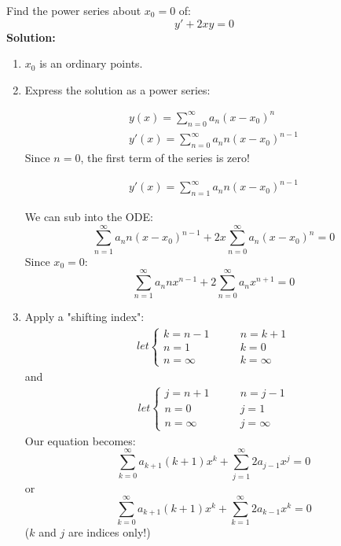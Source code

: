 \begin{exmp}{}
Find the power series about $x_0=0$ of:
\begin{equation*}
y'+2xy=0
\end{equation*}
\textbf{Solution:}\\
\begin{enumerate}
\item $x_0$ is an ordinary points.
\item Express the solution as a power series:

\begin{align*}
y(x) = \sum^\infty_{n=0} a_n\left(x-x_0\right)^n\\
y'(x) = \sum^\infty_{n=0} a_n n\left(x-x_0\right)^{n-1}
\end{align*}
Since $n=0$, the first term of the series is zero!

\begin{align*}
y'(x) = \sum^\infty_{n=1} a_n n\left(x-x_0\right)^{n-1}
\end{align*}

We can sub into the ODE:
\begin{equation*}
\sum^\infty_{n=1} a_n n\left(x-x_0\right)^{n-1}+2x\sum^\infty_{n=0} a_n\left(x-x_0\right)^n=0
\end{equation*}
Since $x_0=0$:
\begin{equation*}
\sum^\infty_{n=1} a_n nx^{n-1}+2\sum^\infty_{n=0} a_nx^{n+1}=0
\end{equation*}
\item Apply a "shifting index":
\begin{align*}
let \begin{cases}
k=n-1 \qquad &n=k+1\\
n=1 &k=0\\
n=\infty &k=\infty
\end{cases}
\end{align*}
 and 
 \begin{align*}
let \begin{cases}
j=n+1 \qquad &n=j-1\\
n=0 &j=1\\
n=\infty &j=\infty
\end{cases}
\end{align*}
Our equation becomes:
\begin{equation*}
\sum^\infty_{k=0} a_{k+1} (k+1) x^{k}+\sum^\infty_{j=1}2 a_{j-1}x^{j}=0
\end{equation*}
or
\begin{equation*}
\sum^\infty_{k=0} a_{k+1} (k+1) x^{k}+\sum^\infty_{k=1}2 a_{k-1}x^{k}=0
\end{equation*}
($k$ and $j$ are indices only!)


\end{enumerate}
\end{exmp}
